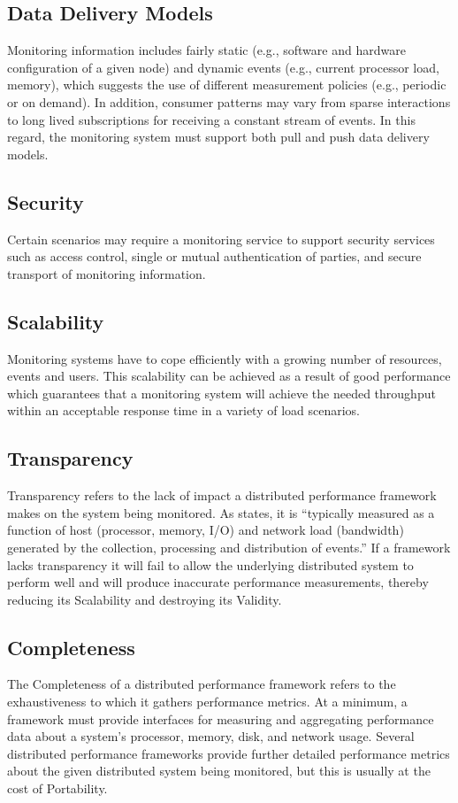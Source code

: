 \subsection{Data Delivery Models}
Monitoring information includes fairly static (e.g., software and hardware configuration of a given node) and dynamic events (e.g., current processor load, memory), which suggests the use of different measurement policies (e.g., periodic or on demand).
In addition, consumer patterns may vary from sparse interactions to long lived subscriptions for receiving a constant stream of events.
In this regard, the monitoring system must support both pull and push data delivery models.
\cite{zanikolas2005}

\subsection{Security}
Certain scenarios may require a monitoring service to support security services such as access control, single or mutual authentication of parties, and secure transport of monitoring information.
\cite{zanikolas2005}

\subsection{Scalability}
Monitoring systems have to cope efficiently with a growing number of resources, events and users.
This scalability can be achieved as a result of good performance which guarantees that a monitoring system will achieve the needed throughput within an acceptable response time in a variety of load scenarios.
\cite{zanikolas2005}

\subsection{Transparency}
Transparency refers to the lack of impact a distributed performance framework makes on the system being monitored.
As \cite{zanikolas2005} states, it is ``typically measured as a function of host (processor, memory, I/O) and network load (bandwidth) generated by the collection, processing and distribution of events.''
If a framework lacks transparency it will fail to allow the underlying distributed system to perform well and will produce inaccurate performance measurements, thereby reducing its Scalability and destroying its Validity.

\subsection{Completeness}
The Completeness of a distributed performance framework refers to the exhaustiveness to which it gathers performance metrics.
At a minimum, a framework must provide interfaces for measuring and aggregating performance data about a system's processor, memory, disk, and network usage.
Several distributed performance frameworks provide further detailed performance metrics about the given distributed system being monitored, but this is usually at the cost of Portability.

